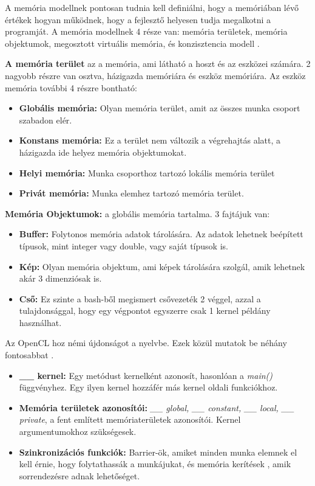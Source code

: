 A memória modellnek pontosan tudnia kell definiálni, hogy a memóriában lévő értékek hogyan működnek, hogy a fejlesztő helyesen tudja megalkotni a programját. A memória modellnek 4 része van: memória területek, memória objektumok, megosztott virtuális memória, és konzisztencia modell \cite{spec}.

\textbf{A memória terület} az a memória, ami látható a hoszt és az eszközei számára. 2 nagyobb részre van osztva, házigazda memóriára és eszköz memóriára. Az eszköz memória további 4 részre bontható:
\begin{itemize}
\item\textbf{Globális memória:} Olyan memória terület, amit az összes munka csoport szabadon elér.
\item\textbf{Konstans memória:} Ez a terület nem változik a végrehajtás alatt, a házigazda ide helyez memória objektumokat.
\item\textbf{Helyi memória:} Munka csoporthoz tartozó lokális memória terület
\item\textbf{Privát memória:} Munka elemhez tartozó memória terület.
\end{itemize}
\textbf{Memória Objektumok:} a globális memória tartalma. 3 fajtájuk van:
\begin{itemize}
\item\textbf{Buffer:} Folytonos memória adatok tárolására. Az adatok lehetnek beépített típusok, mint integer vagy double, vagy saját típusok is.
\item\textbf{Kép:} Olyan memória objektum, ami képek tárolására szolgál, amik lehetnek akár 3 dimenziósak is.
\item\textbf{Cső:} Ez szinte a bash-ből megismert csővezeték 2 véggel, azzal a tulajdonsággal, hogy egy végpontot egyszerre csak 1 kernel példány használhat.
\end{itemize}

Az OpenCL hoz némi újdonságot a nyelvbe. Ezek közül mutatok be néhány fontosabbat \cite{opencl_c}.
\begin{itemize}
\item\textbf{\_\_ kernel:} Egy metódust kernelként azonosít, hasonlóan a \textit{main()} függvényhez. Egy ilyen kernel hozzáfér más kernel oldali funkciókhoz.
\item\textbf{Memória területek azonosítói:}\textit{ \_\_ global, \_\_ constant, \_\_ local, \_\_ private}, a fent említett memóriaterületek azonosítói. Kernel argumentumokhoz szükségesek.
\item\textbf{Szinkronizációs funkciók:} Barrier-ök, amiket minden munka elemnek el kell érnie, hogy folytathassák a munkájukat, és memória kerítések \cite{fence}, amik sorrendezésre adnak lehetőséget.
\end{itemize}

